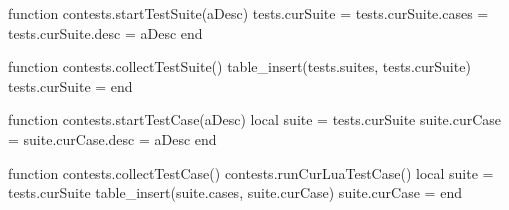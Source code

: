 
\startchapter[title=Unit Test Suites]

\startMkIVCode

\def\startTestSuite[#1]{%
  \startsubsection[title=#1]
  \directlua{thirddata.contests.startTestSuite('#1')}
}

\def\stopTestSuite{%
  \stopsubsection%
  \directlua{thirddata.contests.collectTestSuite()}
}

\def\startTestCase[#1]{%
  \startsubsubsection[title=#1]
  \directlua{thirddata.contests.startTestCase('#1')}
}

\def\stopTestCase{%
  \stopsubsubsection%
  \directlua{thirddata.contests.collectTestCase()}
}

\stopMkIVCode

\startLuaCode

function contests.startTestSuite(aDesc)
  tests.curSuite       = {}
  tests.curSuite.cases = {}
  tests.curSuite.desc  = aDesc
end

function contests.collectTestSuite()
  table_insert(tests.suites, tests.curSuite)
  tests.curSuite = {}
end

function contests.startTestCase(aDesc)
  local suite = tests.curSuite
  suite.curCase = {}
  suite.curCase.desc = aDesc
end

function contests.collectTestCase()
  contests.runCurLuaTestCase()
  local suite = tests.curSuite
  table_insert(suite.cases, suite.curCase)
  suite.curCase = {}
end

\stopLuaCode

\stopchapter